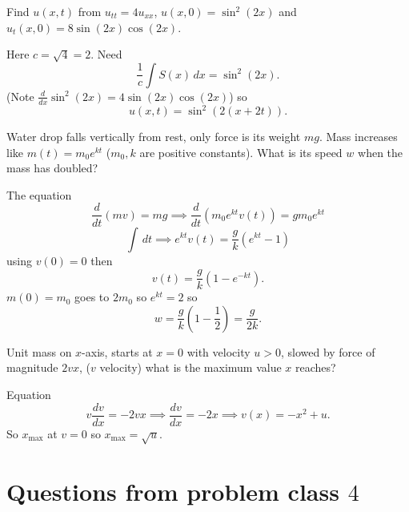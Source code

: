 \documentclass[10pt, a4paper]{article}
\begin{document}
\begin{problem}[$2022$ exam]
    Find $u(x, t)$ from $u_{tt} = 4u_{xx}$,
    $u(x, 0) = \sin ^ 2(2x)$ and $u_t(x, 0) = 8\sin(2x)\cos(2x)$.

    \begin{solution}
        Here $c = \sqrt{4} = 2$.
        Need
        \[
        \frac{1}{c}\int S(x)\,dx = \sin ^ 2(2x).
        \]
        (Note $\frac{d}{dx}\sin ^ 2(2x) = 4\sin(2x)\cos(2x)$)
        so
        \[
        u(x, t) = \sin ^ 2(2(x + 2t)).
        \]
    \end{solution}
\end{problem}

\begin{problem}[$2021$ exam]
    Water drop falls vertically from rest,
    only force is its weight $mg$.
    Mass increases like $m(t) = m_0e ^ {kt}$
    ($m_0, k$ are positive constants).
    What is its speed $w$ when the mass has doubled?

    \begin{solution}
        The equation
        \[
        \frac{d}{dt}(mv) = mg \implies \frac{d}{dt}(m_0e ^ {kt}v(t)) = gm_0e ^ {kt}
        \]
        \[
        \int\,dt \implies e ^ {kt}v(t) = \frac{g}{k}(e ^ {kt} - 1)
        \]
        using $v(0) = 0$ then
        \[
        v(t) = \frac{g}{k}(1 - e ^ {-kt}).
        \]
        $m(0) = m_0$ goes to $2m_0$ so $e ^ {kt} = 2$ so
        \[
        w = \frac{g}{k}\left(1 - \frac{1}{2}\right) = \frac{g}{2k}.
        \]
    \end{solution}
\end{problem}

\begin{problem}[$2021$ exam]
    Unit mass on $x$-axis,
    starts at $x = 0$ with velocity $u > 0$,
    slowed by force of magnitude $2vx$,
    ($v$ velocity)
    what is the maximum value $x$ reaches?

    \begin{solution}
        Equation
        \[
        v\frac{dv}{dx} = -2vx \implies \frac{dv}{dx} = -2x \implies v(x) = -x ^ 2 + u.
        \]
        So $x_{\text{max}}$ at $v = 0$ so $x_{\text{max}} = \sqrt{u}$.
    \end{solution}
\end{problem}

\newpage

\section{Questions from problem class \texorpdfstring{$4$}{}}
\end{document}
